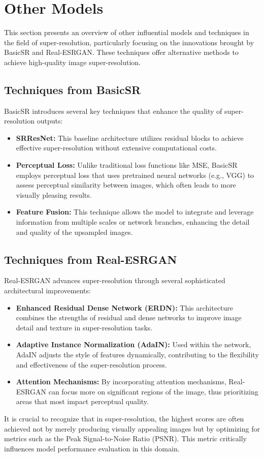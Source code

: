 \section{Other Models}
\label{sec:otherModels} %

This section presents an overview of other influential models and techniques in the field of super-resolution, particularly focusing on the innovations brought by BasicSR and Real-ESRGAN. These techniques offer alternative methods to achieve high-quality image super-resolution.

\subsection{Techniques from BasicSR}
\label{subsec:BasicSR} %

BasicSR introduces several key techniques that enhance the quality of super-resolution outputs:

\begin{itemize}
    \item \textbf{SRResNet:} This baseline architecture utilizes residual blocks to achieve effective super-resolution without extensive computational costs.
    \item \textbf{Perceptual Loss:} Unlike traditional loss functions like MSE, BasicSR employs perceptual loss that uses pretrained neural networks (e.g., VGG) to assess perceptual similarity between images, which often leads to more visually pleasing results.
    \item \textbf{Feature Fusion:} This technique allows the model to integrate and leverage information from multiple scales or network branches, enhancing the detail and quality of the upsampled images.
\end{itemize}

\subsection{Techniques from Real-ESRGAN}
\label{subsec:Real-ESRGAN} %

Real-ESRGAN advances super-resolution through several sophisticated architectural improvements:

\begin{itemize}
    \item \textbf{Enhanced Residual Dense Network (ERDN):} This architecture combines the strengths of residual and dense networks to improve image detail and texture in super-resolution tasks.
    \item \textbf{Adaptive Instance Normalization (AdaIN):} Used within the network, AdaIN adjusts the style of features dynamically, contributing to the flexibility and effectiveness of the super-resolution process.
    \item \textbf{Attention Mechanisms:} By incorporating attention mechanisms, Real-ESRGAN can focus more on significant regions of the image, thus prioritizing areas that most impact perceptual quality.
\end{itemize}

It is crucial to recognize that in super-resolution, the highest scores are often achieved not by merely producing visually appealing images but by optimizing for metrics such as the Peak Signal-to-Noise Ratio (PSNR). This metric critically influences model performance evaluation in this domain.